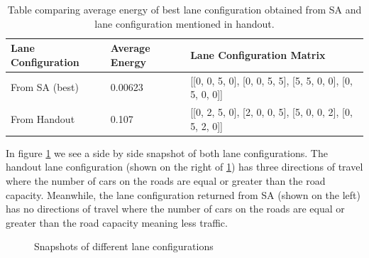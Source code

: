 \documentclass[11pt]{article}
\begin{document}
\begin{table}[H]
\centering
\begin{tabular}{|l|l|l|}
\hline
Lane Configuration & Average Energy & Lane Configuration Matrix\\ \hline
From SA (best)& 0.00623 &  [[0, 0, 5, 0], [0, 0, 5, 5], [5, 5, 0, 0], [0, 5, 0, 0]]\\ \hline
From Handout &  0.107 & [[0, 2, 5, 0], [2, 0, 0, 5], [5, 0, 0, 2], [0, 5, 2, 0]]\\ \hline
\end{tabular}
\caption{\label{table:compare} Table comparing average energy of best lane configuration obtained from SA and lane configuration mentioned in handout.}
\end{table}

In figure \ref{fig:snap} we see a side by side snapshot of both lane configurations. The handout lane configuration (shown on the right of \ref{fig:snap}) has three directions of travel where the number of cars on the roads are equal or greater than the road capacity. Meanwhile, the lane configuration returned from SA (shown on the left) has no directions of travel where the number of cars on the roads are equal or greater than the road capacity meaning less traffic.

\begin{figure}[H]%
    \centering
    \qquad
    \qquad
    \caption{Snapshots of different lane configurations}%
    \label{fig:snap}%
\end{figure}
\end{document}
